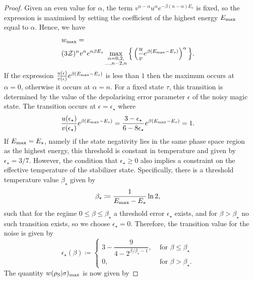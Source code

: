 \documentclass[pra,
aps,
twocolumn,
superscriptaddress,
groupedaddress,
nofootinbib,
reprint
]{revtex4-1}
\begin{document}
\begin{proof}
Given an even value for $\alpha$, the term $v^{n-\alpha} u^{\alpha} e^{-\beta (n-\alpha)E_s}$ is fixed, so the expression is maximised by setting the coefficient of the highest energy $E_{\rm{max}}$ equal to $\alpha$.
Hence, we have
\begin{align}
	&w_{\rm max} = \nonumber\\
	&(3\mathcal{Z})^{n} v^n e^{n\beta E_s}\max\limits_{\substack{\alpha = 0,2, \\ \dots,n-2,n}}{\Big\{ \left( \frac{u}{v} e^{\beta (E_{\rm{max}} - E_s)} \right)^{\alpha} \Big\}}.
\end{align}
If the expression $\frac{u(\epsilon)}{v(\epsilon)} e^{\beta (E_{\rm{max}} - E_s)}$ is less than $1$ then the maximum occurs at $\alpha=0$, otherwise it occurs at $\alpha = n$. For a fixed state $\tau$, this transition is determined by the value of the depolarising error parameter $\epsilon$ of the noisy magic state. The transition occurs at $\epsilon = \epsilon_\star$ where
\begin{equation}\label{eq:noise_transition}
	\frac{u(\epsilon_\star)}{v(\epsilon_\star)} e^{\beta (E_{\rm{max}} - E_s)} = \frac{3-\epsilon_\star}{6-8\epsilon_\star} e^{\beta (E_{\rm{max}} - E_s)} = 1.
\end{equation}
If $E_{\rm{max}} = E_s$, namely if the state negativity lies in the same phase space region as the highest energy, this threshold is constant in temperature and given by $\epsilon_{\star} = 3/7$. However, the condition that $\epsilon_\star \ge 0$ also implies a constraint on the effective temperature of the stabilizer state. Specifically, there is a threshold temperature value $\beta_\star$ given by
\begin{equation}
	\beta_{\star} \coloneqq \frac{1}{E_{\rm{max}} - E_s} \ln2,
\end{equation}
such that for the regime $0 \leq \beta \leq \beta_\star$ a threshold error $\epsilon_\star$ exists, and for $\beta > \beta_\star$ no such transition exists, so we choose $\epsilon_\star = 0$. 
Therefore, the transition value for the noise is given by
\begin{equation}
	\epsilon_{\star}(\beta) \coloneqq 
	\begin{cases}
		3 - \dfrac{9}{4-2^{\beta/\beta_\star - 1}}, &\text{ for } \beta \leq \beta_\star \\
		0, &\text{ for } \beta > \beta_\star.
	\end{cases}
\end{equation}
The quantity $w(\rho_{\rm{S}} | \sigma)_{\rm{max}}$ is now given by

\end{proof}
\end{document}
